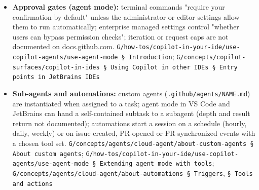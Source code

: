 \begin{itemize}
\item \textbf{Approval gates (agent mode):} terminal commands "require your confirmation by default" unless the administrator or editor settings allow them to run automatically; enterprise managed settings control "whether users can bypass permission checks"; iteration or request caps are not documented on docs.github.com. \texttt{G/\allowbreak{}how-\allowbreak{}tos/\allowbreak{}copilot-\allowbreak{}in-\allowbreak{}your-\allowbreak{}ide/\allowbreak{}use-\allowbreak{}copilot-\allowbreak{}agents/\allowbreak{}use-\allowbreak{}agent-\allowbreak{}mode § Introduction}; \texttt{G/\allowbreak{}concepts/\allowbreak{}copilot-\allowbreak{}surfaces/\allowbreak{}copilot-\allowbreak{}in-\allowbreak{}ides § Using Copilot in other IDEs § Entry points in JetBrains IDEs}
\item \textbf{Sub-agents and automations:} custom agents (\texttt{.\allowbreak{}github/\allowbreak{}agents/\allowbreak{}NAME.\allowbreak{}md}) are instantiated when assigned to a task; agent mode in VS Code and JetBrains can hand a self-contained subtask to a subagent (depth and result return not documented); automations start a session on a schedule (hourly, daily, weekly) or on issue-created, PR-opened or PR-synchronized events with a chosen tool set. \texttt{G/\allowbreak{}concepts/\allowbreak{}agents/\allowbreak{}cloud-\allowbreak{}agent/\allowbreak{}about-\allowbreak{}custom-\allowbreak{}agents § About custom agents}; \texttt{G/\allowbreak{}how-\allowbreak{}tos/\allowbreak{}copilot-\allowbreak{}in-\allowbreak{}your-\allowbreak{}ide/\allowbreak{}use-\allowbreak{}copilot-\allowbreak{}agents/\allowbreak{}use-\allowbreak{}agent-\allowbreak{}mode § Extending agent mode with tools}; \texttt{G/\allowbreak{}concepts/\allowbreak{}agents/\allowbreak{}cloud-\allowbreak{}agent/\allowbreak{}about-\allowbreak{}automations § Triggers}, \texttt{§ Tools and actions}
\end{itemize}

